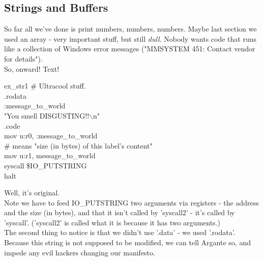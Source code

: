 \documentclass[a4paper,oneside,openany]{book}
\begin{document}
\subsection{Strings and Buffers}
So far all we've done is print numbers, numbers, numbers. Maybe last section
we used an array - very important stuff, but still \emph{dull}. Nobody wants
code that runs like a collection of Windows error messages
("MMSYSTEM 451: Contact vendor for details").\\
So, onward! Text!\\
\begin{codefile}{ex\_str1}
\# Ultracool stuff.\\
.rodata\\
:message\_to\_world\\
\>	"You smell DISGUSTING!!$\backslash$n"\\
.code\\
\>	mov u:r0, :message\_to\_world\\
\>\# \bsz{} means "size (in bytes) of this label's content"\\
\>	mov u:r1, \bsz{}message\_to\_world\\
\>	syscall \$IO\_PUTSTRING\\
\>	halt
\end{codefile}
Well, it's original.\\
Note we have to feed IO\_PUTSTRING two arguments via registers - the
address and the size (in bytes), and that it isn't called by 'syscall2' -
it's called by 'syscall'. ('syscall2' is called what it is because it has two arguments.)\\
The second thing to notice is that we didn't use '.data' - we used
'.rodata'. Because this string is not supposed to be modified, we can
tell Argante so, and impede any evil hackers changing our manifesto.\\
\\
\end{document}
